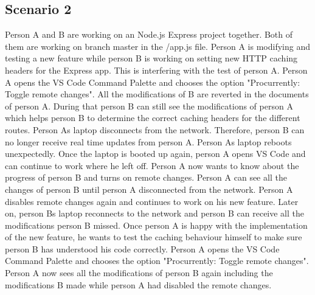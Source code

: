 \subsection{Scenario 2}
Person A and B are working on an Node.js Express project together. Both of them are working on branch master in the /app.js file.
Person A is modifying and testing a new feature while person B is working on setting new HTTP caching headers for the Express app.
This is interfering with the test of person A. Person A opens the VS Code Command Palette and chooses the option "Procurrently: Toggle remote changes".
All the modifications of B are reverted in the documents of person A.
During that person B can still see the modifications of person A which helps person B to determine the correct caching headers for the different routes.
Person As laptop disconnects from the network. Therefore, person B can no longer receive real time updates from person A.
Person As laptop reboots unexpectedly. Once the laptop is booted up again, person A opens VS Code and can continue to work where he left off.
Person A now wants to know about the progress of person B and turns on remote changes. Person A can see all the changes of person B until person A disconnected from the network. Person A disables remote changes again and continues to work on his new feature.
Later on, person Bs laptop reconnects to the network and person B can receive all the modifications person B missed.
Once person A is happy with the implementation of the new feature, he wants to test the caching behaviour himself to make sure person B has understood his code correctly.
Person A opens the VS Code Command Palette and chooses the option "Procurrently: Toggle remote changes".
Person A now sees all the modifications of person B again including the modifications B made while person A had disabled the remote changes.